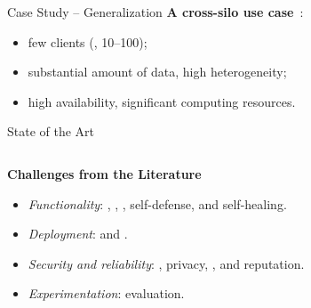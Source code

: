 \begin{frame}{Case Study -- Generalization}
  \textbf{A cross-silo use case}~\cite{kairouz_AdvancesOpenProblems_2021}:
  \begin{itemize}
    \item few clients (\ie, 10--100);
    \item substantial amount of data, high heterogeneity;
    \item high availability, significant computing resources.
  \end{itemize}
\end{frame}



\begin{frame}{State of the Art}
  
  \begin{columns}
    \begin{column}{.45\textwidth}

      \textbf{Challenges from the Literature}~\autocite{lavaur_tnsm_2022}
      \begin{itemize}[<+->]
        \item \emph{Functionality}: , , , self-defense, and self-healing.
        \item \emph{Deployment}:  and .
        \item \emph{Security and reliability}: , privacy, , and reputation.
        \item \emph{Experimentation}: evaluation.
      \end{itemize}
    \end{column}
    \begin{column}{.55\textwidth}
    \end{column}
  \end{columns}

\end{frame}


